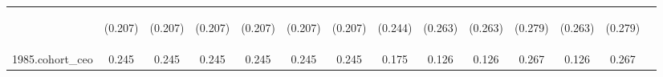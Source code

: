 \begin{center}
\begin{tabular}{lccccccccccccc}
\vspace{4pt} & \begin{footnotesize}(0.207)\end{footnotesize} & \begin{footnotesize}(0.207)\end{footnotesize} & \begin{footnotesize}(0.207)\end{footnotesize} & \begin{footnotesize}(0.207)\end{footnotesize} & \begin{footnotesize}(0.207)\end{footnotesize} & \begin{footnotesize}(0.207)\end{footnotesize} & \begin{footnotesize}(0.244)\end{footnotesize} & \begin{footnotesize}(0.263)\end{footnotesize} & \begin{footnotesize}(0.263)\end{footnotesize} & \begin{footnotesize}(0.279)\end{footnotesize} & \begin{footnotesize}(0.263)\end{footnotesize} & \begin{footnotesize}(0.279)\end{footnotesize} & \begin{footnotesize}\end{footnotesize} \\
1985.cohort\_ceo & 0.245 & 0.245 & 0.245 & 0.245 & 0.245 & 0.245 & 0.175 & 0.126 & 0.126 & 0.267 & 0.126 & 0.267 &  \\

\end{tabular}
\end{center}

